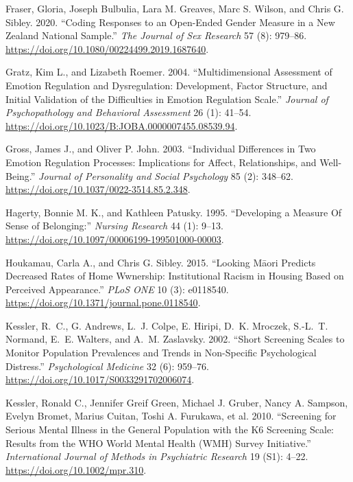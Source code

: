 \documentclass[
  singlecolumn]{report}
\newlength{\cslhangindent}
\newlength{\cslentryspacingunit} %
\newenvironment{CSLReferences}[2] %
 {%
  \setlength{\parindent}{0pt}
  \ifodd #1
  \let\oldpar\par
  \def\par{\hangindent=\cslhangindent\oldpar}
  \fi
  \setlength{\parskip}{#2\cslentryspacingunit}
 }%
 {}
\begin{document}
\begin{CSLReferences}{1}{0}
\leavevmode{}%
Fraser, Gloria, Joseph Bulbulia, Lara M. Greaves, Marc S. Wilson, and
Chris G. Sibley. 2020. {``Coding Responses to an Open-Ended Gender
Measure in a New Zealand National Sample.''} \emph{The Journal of Sex
Research} 57 (8): 979--86.
\url{https://doi.org/10.1080/00224499.2019.1687640}.

\leavevmode{}%
Gratz, Kim L., and Lizabeth Roemer. 2004. {``Multidimensional Assessment
of Emotion Regulation and Dysregulation: Development, Factor Structure,
and Initial Validation of the Difficulties in Emotion Regulation
Scale.''} \emph{Journal of Psychopathology and Behavioral Assessment} 26
(1): 41--54. \url{https://doi.org/10.1023/B:JOBA.0000007455.08539.94}.

\leavevmode{}%
Gross, James J., and Oliver P. John. 2003. {``Individual Differences in
Two Emotion Regulation Processes: Implications for Affect,
Relationships, and Well-Being.''} \emph{Journal of Personality and
Social Psychology} 85 (2): 348--62.
\url{https://doi.org/10.1037/0022-3514.85.2.348}.

\leavevmode{}%
Hagerty, Bonnie M. K., and Kathleen Patusky. 1995. {``Developing a
Measure Of Sense of Belonging:''} \emph{Nursing Research} 44 (1): 9--13.
\url{https://doi.org/10.1097/00006199-199501000-00003}.

\leavevmode{}%
Houkamau, Carla A., and Chris G. Sibley. 2015. {``Looking Māori Predicts
Decreased Rates of Home Wwnership: Institutional Racism in Housing Based
on Perceived Appearance.''} \emph{{PLoS} {ONE}} 10 (3): e0118540.
\url{https://doi.org/10.1371/journal.pone.0118540}.

\leavevmode{}%
Kessler, R.~C., G. Andrews, L.~J. Colpe, E. Hiripi, D.~K. Mroczek,
S.-L.~T. Normand, E.~E. Walters, and A.~M. Zaslavsky. 2002. {``Short
Screening Scales to Monitor Population Prevalences and Trends in
Non-Specific Psychological Distress.''} \emph{Psychological Medicine} 32
(6): 959--76. \url{https://doi.org/10.1017/S0033291702006074}.

\leavevmode{}%
Kessler, Ronald C., Jennifer Greif Green, Michael J. Gruber, Nancy A.
Sampson, Evelyn Bromet, Marius Cuitan, Toshi A. Furukawa, et al. 2010.
{``Screening for Serious Mental Illness in the General Population with
the K6 Screening Scale: Results from the WHO World Mental Health (WMH)
Survey Initiative.''} \emph{International Journal of Methods in
Psychiatric Research} 19 (S1): 4--22.
\url{https://doi.org/10.1002/mpr.310}.


\end{CSLReferences}
\end{document}
